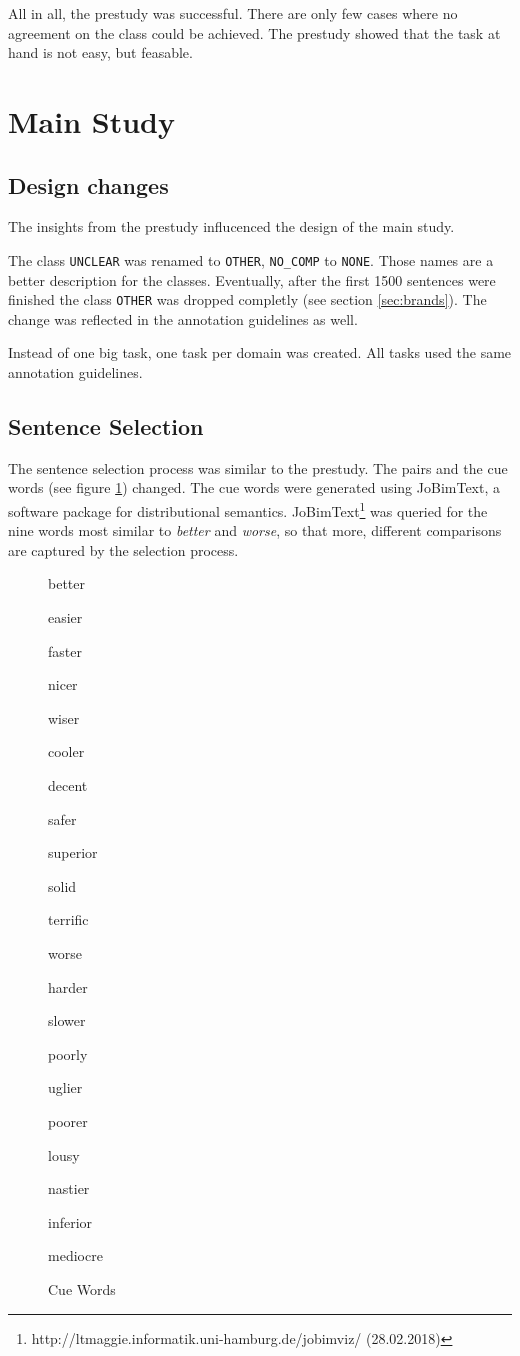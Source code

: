 All in all, the prestudy was successful. There are only few cases where no agreement on the class could be achieved. The prestudy showed that the task at hand is not easy, but feasable.

\newpage
\section{Main Study}
\label{sec:mainstudy}
\subsection{Design changes}
The insights from the prestudy influcenced the design of the main study.

The class \texttt{UNCLEAR} was renamed to \texttt{OTHER}, \texttt{NO\_COMP} to \texttt{NONE}. Those names are a better description for the classes. Eventually, after the first 1500 sentences were finished the class \texttt{OTHER} was dropped completly (see section \ref{sec:brands}). The change was reflected in the annotation guidelines as well. 

Instead of one big task, one task per domain was created. All tasks used the same annotation guidelines.


\subsection{Sentence Selection}
The sentence selection process was similar to the prestudy. The pairs and the cue words (see figure \ref{fig:cue_words}) changed. The cue words were generated using JoBimText, a software package for distributional semantics. JoBimText\footnote{http://ltmaggie.informatik.uni-hamburg.de/jobimviz/ (28.02.2018)} was queried for the nine words most similar to \emph{better} and \emph{worse}, so that more, different comparisons are captured by the selection process.

\begin{figure}[h]
\centering
\caption{Cue Words}
\label{fig:cue_words}
\begin{multicols}{4}
better

easier

faster

nicer

wiser

cooler

decent

safer

superior

solid

terrific

worse

harder

slower

poorly

uglier

poorer

lousy

nastier

inferior

mediocre
\end{multicols}
\end{figure}

